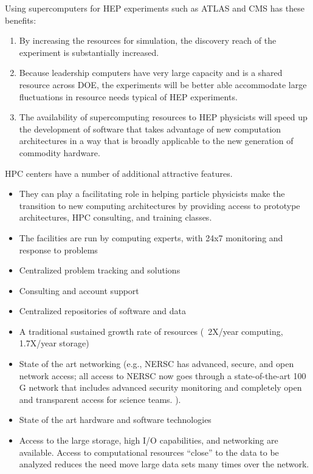 Using supercomputers for HEP experiments such as ATLAS and CMS has these benefits:
\begin{enumerate} 
\item{By increasing the resources for simulation, the discovery reach of the experiment is substantially increased.}
\item{Because leadership computers have very large capacity and is a shared resource across DOE, the experiments will be better able accommodate large fluctuations in resource needs typical of HEP experiments.}
\item{The availability of supercomputing resources to HEP physicists will speed up the development of software that takes advantage of new computation architectures in a way that is broadly applicable to the new generation of commodity hardware.}
\end{enumerate}
 
HPC centers have a number of additional attractive features.

\begin{itemize} 
\item{They can play a facilitating role in helping particle physicists make the transition to new computing architectures by providing access to prototype architectures, HPC consulting, and training classes.}
\item{The facilities are run by computing experts, with 24x7 monitoring and response to problems}
\item{Centralized problem tracking and solutions}
\item{Consulting and account support}
\item{Centralized repositories of software and data}
\item{A traditional sustained growth rate of resources (~2X/year computing, 1.7X/year storage)}
\item{State of the art networking (e.g., NERSC has advanced, secure, and open network access; all access to NERSC now goes through a state-of-the-art 100 G network that includes advanced security monitoring and completely open and transparent access for science teams. ).}
\item{State of the art hardware and software technologies}
\item{Access to the large storage, high I/O capabilities, and networking are available.  Access to computational resources “close” to the data to be analyzed reduces the need move large data sets many times over the network.}
\end{itemize} 

